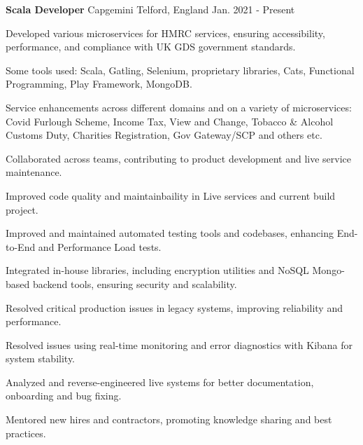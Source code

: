 
\begin{cventries}

  \cventry
    {\textbf{Scala Developer}} %
    {Capgemini} 
    {Telford, England} 
    {Jan. 2021 - Present} 
    {
      \begin{sloppypar}  %
      \begin{cvitems}
        \item {Developed various microservices for HMRC services, ensuring accessibility, performance, and compliance with UK GDS government standards.}
        \item {Some tools used: Scala, Gatling, Selenium, proprietary libraries, Cats, Functional Programming, Play Framework, MongoDB.}
        \item {Service enhancements across different domains and on a variety of microservices: Covid Furlough Scheme, Income Tax, View and Change, Tobacco \& Alcohol Customs Duty, Charities Registration, Gov Gateway/SCP and others etc.}
        \item {Collaborated across teams, contributing to product development and live service maintenance.}
        \item {Improved code quality and maintainbaility in Live services and current build project.}
        \item {Improved and maintained automated testing tools and codebases, enhancing End-to-End and Performance Load tests.}
        \item {Integrated in-house libraries, including encryption utilities and NoSQL Mongo-based backend tools, ensuring security and scalability.}
        \item {Resolved critical production issues in legacy systems, improving reliability and performance.}
        \item {Resolved issues using real-time monitoring and error diagnostics with Kibana for system stability.}
        \item {Analyzed and reverse-engineered live systems for better documentation, onboarding and bug fixing.}
        \item {Mentored new hires and contractors, promoting knowledge sharing and best practices.}
      \end{cvitems}
      \end{sloppypar}
    }
    \cventry

\end{cventries}
